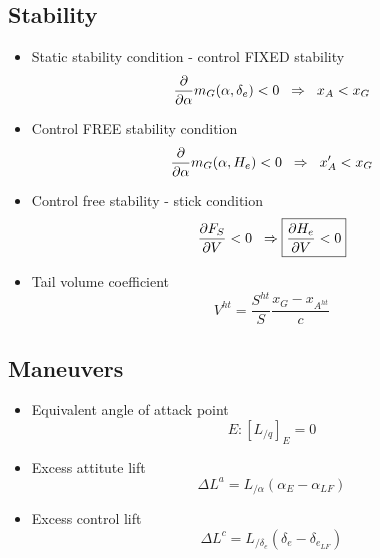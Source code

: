 \subsection{Stability}
    \begin{itemize}
        \item Static stability condition - control FIXED stability
        \begin{equation}
            \frac{\partial}{\partial \alpha}m_G(\alpha,\delta_e)<0 \hspace{2mm} \Rightarrow \hspace{2mm}x_A<x_G
        \end{equation}
        \item Control FREE stability condition
        \begin{equation}
            \frac{\partial}{\partial \alpha}m_G(\alpha,H_e)<0 \hspace{2mm} \Rightarrow \hspace{2mm}x_A'<x_G
        \end{equation}
        \item Control free stability - stick condition
        \begin{equation}
            \frac{\partial F_S}{\partial V}<0 \hspace{2mm} \Rightarrow \boxed{\frac{\partial H_e}{\partial V}<0}
        \end{equation}
        \item Tail volume coefficient
        \begin{equation}
            V^{ht} = \frac{S^{ht}}{S}\frac{x_G-x_{A^{ht}}}{c}
        \end{equation}
   
    \end{itemize}
\subsection{Maneuvers}
    \begin{itemize}
        \item Equivalent angle of attack point
        \begin{equation}
            E: \left[L_{/q}\right]_E=0
        \end{equation}
        \item Excess attitute lift
        \begin{equation}
            \Delta L^a = L_{/\alpha}(\alpha_E-\alpha_{LF})
        \end{equation}
        \item Excess control lift
        \begin{equation}
            \Delta L^c = L_{/\delta_e}(\delta_e-\delta_{e_{LF}})
        \end{equation}
    \end{itemize}
